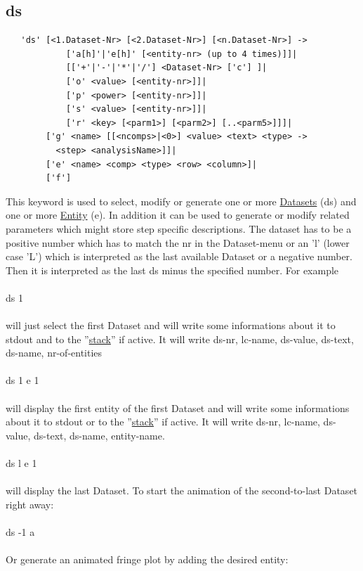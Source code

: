 \documentclass{article}
\providecommand{\htmlref}[2]{\hyperref[#2]{#1}}
\begin{document}
\subsection{\label{ds}ds}
\begin{verbatim}
   'ds' [<1.Dataset-Nr> [<2.Dataset-Nr>] [<n.Dataset-Nr>] ->
            ['a[h]'|'e[h]' [<entity-nr> (up to 4 times)]]|
            [['+'|'-'|'*'|'/'] <Dataset-Nr> ['c'] ]|
            ['o' <value> [<entity-nr>]]|
            ['p' <power> [<entity-nr>]]|
            ['s' <value> [<entity-nr>]]|
            ['r' <key> [<parm1>] [<parm2>] [..<parm5>]]]|
        ['g' <name> [[<ncomps>|<0>] <value> <text> <type> ->
          <step> <analysisName>]]|
        ['e' <name> <comp> <type> <row> <column>]|
        ['f']
\end{verbatim}
This keyword is used to select, modify or generate one or more \htmlref{Datasets}{Datasets} (ds) and one or more \htmlref{Entity}{Entity} (e). In addition it can be used to generate or modify related parameters which might store step specific descriptions. The dataset has to be a positive number which has to match the nr in the Dataset-menu or an 'l' (lower case 'L') which is interpreted as the last available Dataset or a negative number. Then it is interpreted as the last ds minus the specified number. For example\\\\
ds 1\\\\
will just select the first Dataset and will write some informations about it to stdout and to the ''\htmlref{stack}{stack}'' if active. It will write ds-nr, lc-name, ds-value, ds-text, ds-name, nr-of-entities \\\\
ds 1 e 1\\\\
will display the first entity of the first Dataset and will write some informations about it to stdout or to the ''\htmlref{stack}{stack}'' if active. It will write ds-nr, lc-name, ds-value, ds-text, ds-name, entity-name.\\\\
ds l e 1\\\\
will display the last Dataset.
To start the animation of the second-to-last Dataset right away:\\\\
ds -1 a\\\\
Or generate an animated fringe plot by adding the desired entity:\\\\
\end{document}
